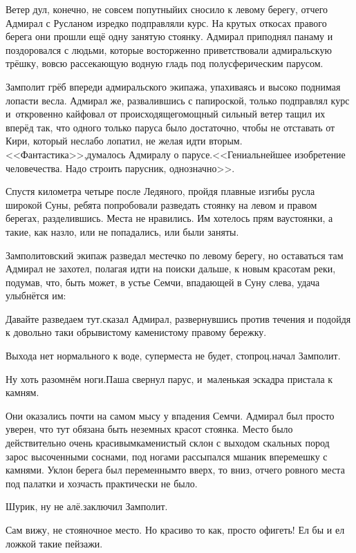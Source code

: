 Ветер дул, конечно, не совсем попутный\mdash их сносило к левому берегу, отчего Адмирал с Русланом изредко подправляли курс. На крутых откосах правого берега они прошли ещё одну занятую стоянку. Адмирал приподнял панаму и поздоровался с людьми, которые восторженно приветствовали адмиральскую трёшку, вовсю рассекающую водную гладь под полусферическим парусом.

Замполит грёб впереди адмиральского экипажа, упахиваясь и высоко поднимая лопасти весла. Адмирал же, развалившись с папироской, только подправлял курс и~откровенно кайфовал от происходящего\mdash мощный сильный ветер тащил их вперёд так, что одного только паруса было достаточно, чтобы не отставать от Кири, который неслабо лопатил, не желая идти вторым. <<Фантастика>>,\mdash думалось Адмиралу о парусе.\mdash<<Гениальнейшее изобретение человечества. Надо строить парусник, однозначно>>.

Спустя километра четыре после Ледяного, пройдя плавные изгибы русла широкой Суны, ребята попробовали разведать стоянку на левом и правом берегах, разделившись. Места не нравились. Им хотелось прям вау\sdash стоянки, а такие, как назло, или не попадались, или были заняты.

Замполитовский экипаж разведал местечко по левому берегу, но оставаться там Адмирал не захотел, полагая идти на поиски дальше, к новым красотам реки, подумав, что, быть может, в устье Семчи, впадающей в Суну слева, удача улыбнётся им:

\diagdash Давайте разведаем тут.\mdash сказал Адмирал, развернувшись против течения и подойдя к довольно таки обрывистому каменистому правому бережку.

\diagdash Выхода нет нормального к воде, супер\sdash места не будет, стопроц.\mdash начал Замполит.

\diagdash Ну хоть разомнём ноги.\mdash Паша свернул парус, и~маленькая эскадра пристала к камням.

Они оказались почти на самом мысу у впадения Семчи. Адмирал был просто уверен, что тут обязана быть неземных красот стоянка. Место было действительно очень красивым\mdash каменистый склон с выходом скальных пород зарос высоченными соснами, под ногами рассыпался мшаник вперемешку с камнями. Уклон берега был переменным\mdash то вверх, то вниз, отчего ровного места под палатки и хозчасть практически не было.

\diagdash Шурик, ну не алё.\mdash заключил Замполит.

\diagdash Сам вижу, не стояночное место. Но красиво то как, просто офигеть! Ел бы и ел ложкой такие пейзажи.

